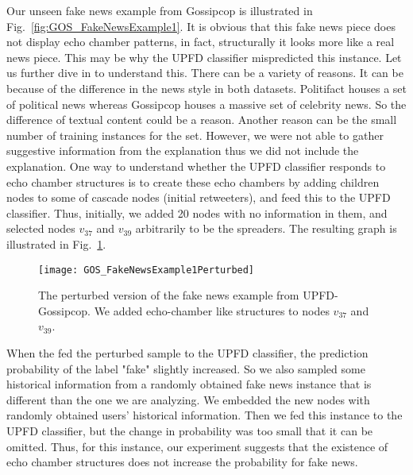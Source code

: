 Our unseen fake news example from Gossipcop is illustrated in Fig.~\ref{fig:GOS_FakeNewsExample1}. It is obvious that this fake news piece does not display echo chamber patterns, in fact, structurally it looks more like a real news piece. This may be why the UPFD classifier mispredicted this instance. Let us further dive in to understand this. There can be a variety of reasons. It can be because of the difference in the news style in both datasets. Politifact houses a set of political news whereas Gossipcop houses a massive set of celebrity news. So the difference of textual content could be a reason. Another reason can be the small number of training instances for the set. However, we were not able to gather suggestive information from the explanation thus we did not include the explanation. One way to understand whether the UPFD classifier responds to echo chamber structures is to create these echo chambers by adding children nodes to some of cascade nodes (initial retweeters), and feed this to the UPFD classifier. Thus, initially, we added 20 nodes with no information in them, and selected nodes $v_{37}$ and $v_{39}$ arbitrarily to be the spreaders. The resulting graph is illustrated in Fig.~\ref{fig:GOS_FakeNewsExample1Perturbed}.
\begin{figure}
    \centering
    \texttt{[image: GOS\_FakeNewsExample1Perturbed]}
    \caption[The perturbed version of the fake news example from UPFD-Gossipcop]{The perturbed version of the fake news example from UPFD-Gossipcop. We added echo-chamber like structures to nodes $v_{37}$ and $v_{39}$.}
    \label{fig:GOS_FakeNewsExample1Perturbed}
\end{figure}
When the fed the perturbed sample to the UPFD classifier, the prediction probability of the label "fake" slightly increased. So we also sampled some historical information from a randomly obtained fake news instance that is different than the one we are analyzing. We embedded the new nodes with randomly obtained users' historical information. Then we fed this instance to the UPFD classifier, but the change in probability was too small that it can be omitted. Thus, for this instance, our experiment suggests that the existence of echo chamber structures does not increase the probability for fake news.\\
